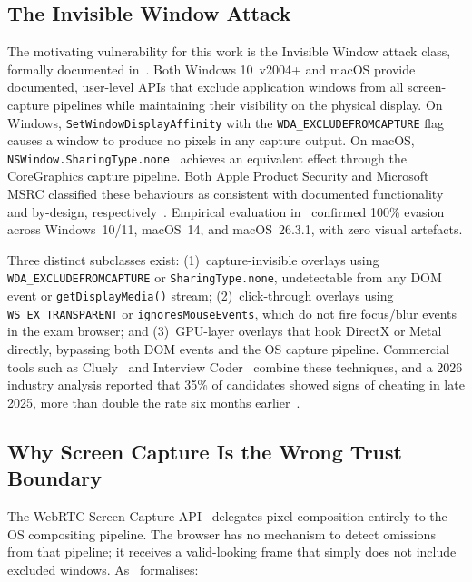\documentclass[conference]{IEEEtran}
\begin{document}
\subsection{The Invisible Window Attack}

The motivating vulnerability for this work is the Invisible Window attack class, formally documented in~\cite{abedini2026invisible}. Both Windows 10~v2004+ and macOS provide documented, user-level APIs that exclude application windows from all screen-capture pipelines while maintaining their visibility on the physical display. On Windows, \texttt{SetWindowDisplayAffinity} with the \texttt{WDA\_EXCLUDEFROMCAPTURE} flag~\cite{microsoft2025setwindow} causes a window to produce no pixels in any capture output. On macOS, \texttt{NSWindow.SharingType.none}~\cite{apple2025sharingtype} achieves an equivalent effect through the CoreGraphics capture pipeline. Both Apple Product Security and Microsoft MSRC classified these behaviours as consistent with documented functionality and by-design, respectively~\cite{abedini2026invisible}. Empirical evaluation in~\cite{abedini2026invisible} confirmed 100\% evasion across Windows~10/11, macOS~14, and macOS~26.3.1, with zero visual artefacts.

Three distinct subclasses exist: (1)~capture-invisible overlays using \texttt{WDA\_EXCLUDEFROMCAPTURE} or \texttt{SharingType.none}, undetectable from any DOM event or \texttt{getDisplayMedia()} stream; (2)~click-through overlays using \texttt{WS\_EX\_TRANSPARENT} or \texttt{ignoresMouseEvents}, which do not fire focus/blur events in the exam browser; and (3)~GPU-layer overlays that hook DirectX or Metal directly, bypassing both DOM events and the OS capture pipeline. Commercial tools such as Cluely~\cite{cluely2025} and Interview Coder~\cite{interviewcoder2026} combine these techniques, and a 2026 industry analysis reported that 35\% of candidates showed signs of cheating in late 2025, more than double the rate six months earlier~\cite{fabrichq2026cheating}.

\subsection{Why Screen Capture Is the Wrong Trust Boundary}

The WebRTC Screen Capture API~\cite{bruaroey2025screen} delegates pixel composition entirely to the OS compositing pipeline. The browser has no mechanism to detect omissions from that pipeline; it receives a valid-looking frame that simply does not include excluded windows. As~\cite{abedini2026invisible} formalises:
\end{document}
